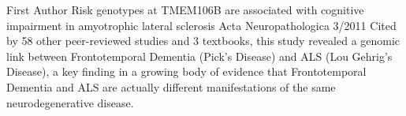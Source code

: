 
\begin{cventries}
  \cventry
    {First Author}
    {Risk genotypes at TMEM106B are associated with cognitive impairment in amyotrophic lateral sclerosis}
    {Acta Neuropathologica}
    {3/2011}
    {Cited by 58 other peer-reviewed studies and 3 textbooks, this study revealed a genomic link between  Frontotemporal Dementia (Pick's Disease) and ALS (Lou Gehrig's Disease), a key finding in a growing body of evidence that Frontotemporal Dementia and ALS are actually different manifestations of the same neurodegenerative disease.}
    
\end{cventries}